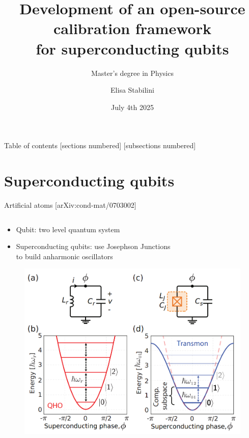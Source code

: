 \documentclass[aspectratio=169,10pt]{beamer}
\title{Development of an open-source calibration framework\\ for superconducting qubits}
\subtitle{Master's degree in Physics}
\author{Elisa Stabilini}
\institute{Università degli Studi di Milano - Department of Physics}
\date{July 4th 2025}
\begin{document}
\maketitle

\begin{frame}{Table of contents}
    [sections numbered]
    [subsections numbered]  
    \tableofcontents[hideallsubsections]
\end{frame}



\section{Superconducting qubits}

\begin{frame}{Artificial atoms \hfill{\small[arXiv:cond-mat/0703002]}}
  \begin{columns}
    \begin{column}{0.6\textwidth}
      \centering
      \begin{itemize}
        \item<1-> Qubit: two level quantum system
        \hspace{10 mm}
        \item<2-> Superconducting qubits: use Josephson Junctions\\ to build anharmonic oscillators
      \end{itemize}
      \begin{figure}
        \centering
        \includegraphics[height=0.5\textheight]{figures/Transmon.png}\\

\end{figure}
\end{column}
\end{columns}
\end{frame}
\end{document}
